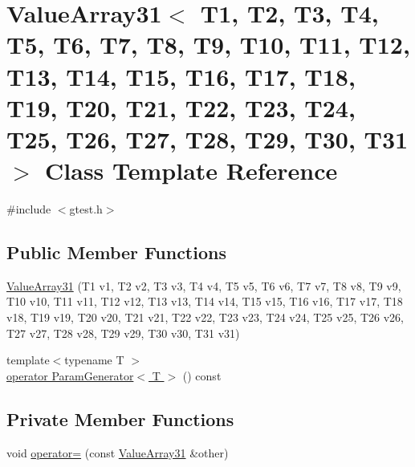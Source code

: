 \hypertarget{classtesting_1_1internal_1_1ValueArray31}{\section{\-Value\-Array31$<$ \-T1, \-T2, \-T3, \-T4, \-T5, \-T6, \-T7, \-T8, \-T9, \-T10, \-T11, \-T12, \-T13, \-T14, \-T15, \-T16, \-T17, \-T18, \-T19, \-T20, \-T21, \-T22, \-T23, \-T24, \-T25, \-T26, \-T27, \-T28, \-T29, \-T30, \-T31 $>$ \-Class \-Template \-Reference}
\label{dd/d05/classtesting_1_1internal_1_1ValueArray31}
}


{\ttfamily \#include $<$gtest.\-h$>$}

\subsection*{\-Public \-Member \-Functions}
\begin{DoxyCompactItemize}
\item 
\hyperlink{classtesting_1_1internal_1_1ValueArray31_ac6518af37f3c7ee6e85dd7b122c6d8c1}{\-Value\-Array31} (\-T1 v1, \-T2 v2, \-T3 v3, \-T4 v4, \-T5 v5, \-T6 v6, \-T7 v7, \-T8 v8, \-T9 v9, \-T10 v10, \-T11 v11, \-T12 v12, \-T13 v13, \-T14 v14, \-T15 v15, \-T16 v16, \-T17 v17, \-T18 v18, \-T19 v19, \-T20 v20, \-T21 v21, \-T22 v22, \-T23 v23, \-T24 v24, \-T25 v25, \-T26 v26, \-T27 v27, \-T28 v28, \-T29 v29, \-T30 v30, \-T31 v31)
\item 
{\footnotesize template$<$typename T $>$ }\\\hyperlink{classtesting_1_1internal_1_1ValueArray31_a08ef46fa12c9dd8ef6fc630baeea89b7}{operator Param\-Generator$<$ T $>$} () const 
\end{DoxyCompactItemize}
\subsection*{\-Private \-Member \-Functions}
\begin{DoxyCompactItemize}
\item 
void \hyperlink{classtesting_1_1internal_1_1ValueArray31_a79ebdea301c665b81dd8edba84ecf4fa}{operator=} (const \hyperlink{classtesting_1_1internal_1_1ValueArray31}{\-Value\-Array31} \&other)
\end{DoxyCompactItemize}
